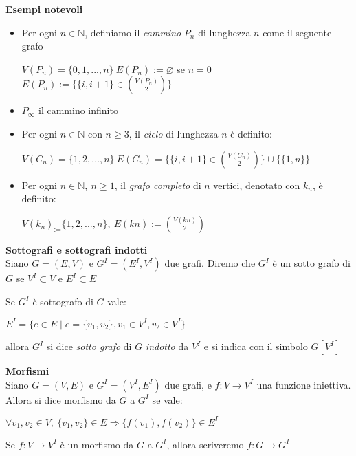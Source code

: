 \documentclass[11pt, letterpaper]{article}
\begin{document}
\textbf{Esempi notevoli}
\begin{itemize}
    \item Per ogni $n\in\mathbb{N}$, definiamo il \textit{cammino} $P_{n}$ di lunghezza $n$ come il
    seguente grafo 
    \begin{center}
        $V(P_{n})=\{0,1,...,n\}\ E(P_{n}):= \varnothing $ se $n=0$\\
        $E(P_{n}):=\{\{i,i+1\}\in\binom{V(P_{n})}{2}\}$ 
    \end{center}
    \item $P_{\infty}$ il cammino infinito
    \item Per ogni $n\in\mathbb{N}$ con $n\geq 3$, il \textit{ciclo} di lunghezza $n$ è definito:
    \begin{center}
        $V(C_{n})=\{1,2,...,n\}\ E(C_{n})=\{\{i,i+1\}\in\binom{V(C_{n})}{2}\}\cup\{\{1,n\}\}$
    \end{center}
    \item Per ogni $n\in\mathbb{N},\ n\geq 1$, il \textit{grafo completo} di $n$ vertici, denotato con
    $k_{n}$, è definito:
    \begin{center}
        $V(k_{n})_:=\{1,2,...,n\},\ E(kn):=\binom{V(kn)}{2}$
    \end{center}
\end{itemize}

\newpage
\textbf{Sottografi e sottografi indotti}\\ Siano $G=(E,V)$ e $G^{I}=(E^{I},V^{I})$ due grafi. Diremo 
che $G^{I}$ è un sotto grafo di $G$ se $V^{I}\subset V$ e $E^{I}\subset E$

Se $G^{I}$ è sottografo di $G$ vale:
\begin{center}
    $E^{I}=\{e\in E\mid e=\{v_{1},v_{2}\}, v_{1}\in V^{I},v_{2}\in V^{I}\}$
\end{center}
allora $G^{I}$ si dice \textit{sotto grafo} di $G$ \textit{indotto} da $V^{I}$ e si indica con il
simbolo $G[V^{I}]$


\textbf{Morfismi}\\ Siano $G=(V,E)$ e $G^{I}=(V^{I},E^{I})$ due grafi, e $f:V\rightarrow V^{I}$ 
una funzione iniettiva. Allora si dice morfismo da $G$ a $G^{I}$ se vale:
\begin{center}
    $\forall v_{1},v_{2}\in V,\ \{v_{1},v_{2}\}\in E\Rightarrow \{f(v_{1}),f(v_{2})\}\in E^{I}$
\end{center}
Se $f:V\rightarrow V^{I}$ è un morfismo da $G$ a $G^{I}$, allora scriveremo $f:G\rightarrow G^{I}$
\end{document}
